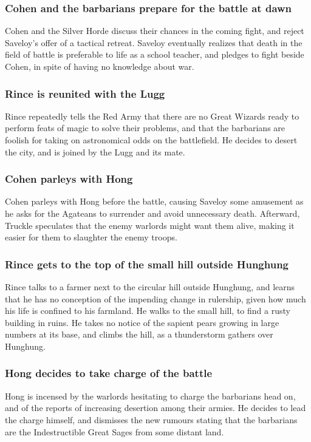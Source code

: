 \subsubsection{\Gls{Cohen} and the barbarians prepare for the battle at dawn}
\Gls{Cohen} and the Silver Horde discuss their chances in the coming fight, and reject
\Gls{Saveloy}'s offer of a tactical retreat. \Gls{Saveloy} eventually realizes that death in the
field of battle is preferable to life as a school teacher, and pledges to fight beside \Gls{Cohen},
in spite of having no knowledge about war.

\subsubsection{\Gls{Rince} is reunited with the \Gls{Lugg}}
\Gls{Rince} repeatedly tells the Red Army that there are no Great Wizards ready to perform feats of
magic to solve their problems, and that the barbarians are foolish for taking on astronomical odds
on the battlefield. He decides to desert the city, and is joined by the \Gls{Lugg} and its mate.

\subsubsection{\Gls{Cohen} parleys with \Gls{Hong}}
\Gls{Cohen} parleys with \Gls{Hong} before the battle, causing \Gls{Saveloy} some amusement as he
asks for the Agateans to surrender and avoid unnecessary death. Afterward, \Gls{Truckle} speculates
that the enemy warlords might want them alive, making it easier for them to slaughter the enemy
troops.

\subsubsection{\Gls{Rince} gets to the top of the small hill outside Hunghung}
\Gls{Rince} talks to a farmer next to the circular hill outside Hunghung, and learns that he has no
conception of the impending change in rulership, given how much his life is confined to his
farmland. He walks to the small hill, to find a rusty building in ruins. He takes no notice of the
sapient pears growing in large numbers at its base, and climbs the hill, as a thunderstorm gathers
over Hunghung.

\subsubsection{\Gls{Hong} decides to take charge of the battle}
\Gls{Hong} is incensed by the warlords hesitating to charge the barbarians head on, and of the
reports of increasing desertion among their armies. He decides to lead the charge himself, and
dismisses the new rumours stating that the barbarians are the Indestructible Great Sages from some
distant land.

